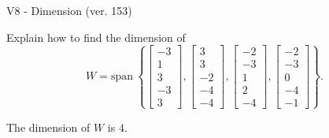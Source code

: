 \begin{exercise}
  \begin{exerciseTitle}V8 - Dimension (ver. 153)\end{exerciseTitle}
  \begin{exerciseStatement}
    Explain how to find the dimension of 
\[W=\mathrm{span}\ \left\{\left[\begin{array}{r}
-3 \\
1 \\
3 \\
-3 \\
3
\end{array}\right] , \left[\begin{array}{r}
3 \\
3 \\
-2 \\
-4 \\
-4
\end{array}\right] , \left[\begin{array}{r}
-2 \\
-3 \\
1 \\
2 \\
-4
\end{array}\right] , \left[\begin{array}{r}
-2 \\
-3 \\
0 \\
-4 \\
-1
\end{array}\right]\right\}.\]



  \end{exerciseStatement}
  \begin{exerciseAnswer}
   The dimension of \(W\) is  \(4\).
  


  \end{exerciseAnswer}
\end{exercise}